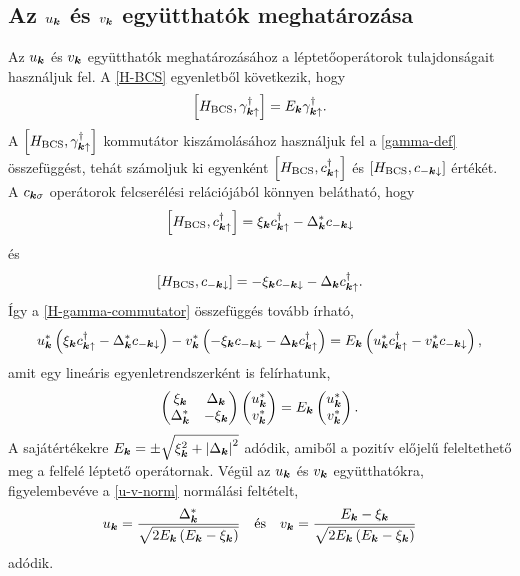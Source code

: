 \documentclass[a4paper,12pt,titlepage]{article}
\newcommand{\KK}{{\vb*{k}}}
\begin{document}
\subsection{Az $u_\KK$ és $v_\KK$ együtthatók meghatározása}

Az $u_\KK$ és $v_\KK$ együtthatók meghatározásához a léptetőoperátorok tulajdonságait használjuk fel.  A \eqref{H-BCS} egyenletből következik, hogy
\begin{equation} \label{H-gamma-commutator}
	\commutator{H_\text{BCS}}{\gamma_{\KK \uparrow}^\dagger} = E_\KK \gamma_{\KK \uparrow}^\dagger.
\end{equation}
A $\commutator{H_\text{BCS}}{\gamma_{\KK \uparrow}^\dagger}$ kommutátor kiszámolásához használjuk fel a \eqref{gamma-def} összefüggést, tehát számoljuk ki egyenként $\commutator{H_\text{BCS}}{c_{\KK \uparrow}^\dagger}$ és $\commutator{H_\text{BCS}}{c_{-\KK \downarrow}}$ értékét.  A $c_{\KK \sigma}$ operátorok felcserélési relációjából könnyen belátható, hogy
\begin{equation}
	\commutator{H_\text{BCS}}{c_{\KK \uparrow}^\dagger} = \xi_\KK c_{\KK \uparrow}^\dagger - \Delta_\KK^* c_{-\KK \downarrow}
\end{equation}
és
\begin{equation}
	\commutator{H_\text{BCS}}{c_{-\KK \downarrow}} = -\xi_\KK c_{-\KK \downarrow} - \Delta_\KK c_{\KK \uparrow}^\dagger.
\end{equation}
Így a \eqref{H-gamma-commutator} összefüggés tovább írható,
\begin{equation}
	u_\KK^* \left( \xi_\KK c_{\KK \uparrow}^\dagger - \Delta_\KK^* c_{-\KK \downarrow} \right) - v_\KK^* \left( -\xi_\KK c_{-\KK \downarrow} - \Delta_\KK c_{\KK \uparrow}^\dagger \right) = E_\KK \left( u_\KK^* c_{\KK \uparrow}^\dagger - v_\KK^* c_{-\KK \downarrow} \right),
\end{equation}
amit egy lineáris egyenletrendszerként is felírhatunk,
\begin{equation}
	\begin{pmatrix}
		\xi_\KK & \Delta_\KK \\
		\Delta_\KK^* & -\xi_\KK
	\end{pmatrix} \begin{pmatrix} u_\KK^* \\ v_\KK^* \end{pmatrix}
	= E_\KK \begin{pmatrix} u_\KK^* \\ v_\KK^* \end{pmatrix}.
\end{equation}
A sajátértékekre $E_\KK = \pm \sqrt{\xi_\KK^2 + \left| \Delta_\KK \right|^2}$ adódik, amiből a pozitív előjelű feleltethető meg a felfelé léptető operátornak.  Végül az $u_\KK$ és $v_\KK$ együtthatókra, figyelembevéve a \eqref{u-v-norm} normálási feltételt,
\begin{equation} \label{u-v-sc}
	u_\KK = \frac{\Delta_\KK^*}{\sqrt{2 E_\KK \left( E_\KK - \xi_\KK \right)}} ~~~ \text{és} ~~~ v_\KK = \frac{E_\KK - \xi_\KK}{\sqrt{2 E_\KK \left( E_\KK - \xi_\KK \right)}}
\end{equation}
adódik.
\end{document}

